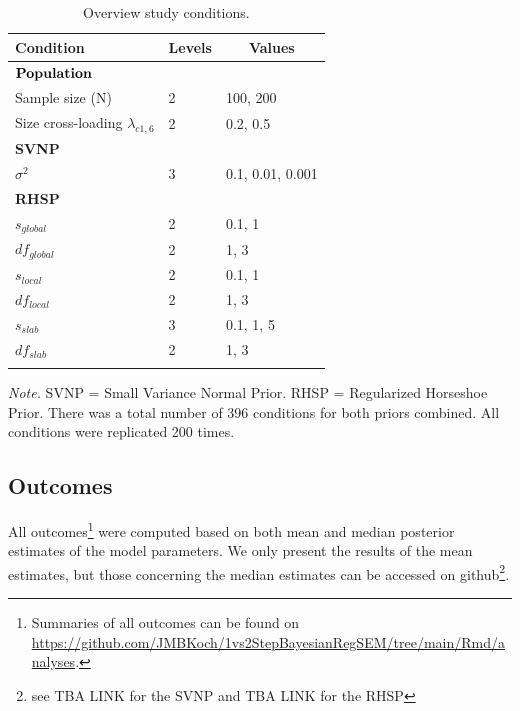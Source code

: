 \documentclass[
  man, donotrepeattitle,floatsintext]{apa6}
\begin{document}
\begin{table}[tbp]

\begin{center}
\begin{threeparttable}

\caption{\label{tab:unnamed-chunk-2}Overview study conditions.}

\begin{tabular}{lll}
\toprule
Condition & \multicolumn{1}{c}{Levels} & \multicolumn{1}{c}{Values}\\
\midrule
$\bf{Population}$ &  & \\
Sample size (N) & 2 & 100, 200\\
Size cross-loading $\lambda_{c1 , 6}$ & 2 & 0.2, 0.5\\
\bf{SVNP} &  & \\
$\sigma^2$ & 3 & 0.1, 0.01, 0.001\\
\bf{RHSP} &  & \\
$s_{global}$ & 2 & 0.1, 1\\
$df_{global}$ & 2 & 1, 3\\
$s_{local}$ & 2 & 0.1, 1\\
$df_{local}$ & 2 & 1, 3\\
$s_{slab}$ & 3 & 0.1, 1, 5\\
$df_{slab}$ & 2 & 1, 3\\
\bottomrule
\addlinespace
\end{tabular}

\begin{tablenotes}[para]
\normalsize{\textit{Note.} SVNP = Small Variance Normal Prior. RHSP = Regularized Horseshoe Prior. There was a total number of 396 conditions for both priors combined.  All conditions were replicated 200 times.}
\end{tablenotes}

\end{threeparttable}
\end{center}

\end{table}

\hypertarget{outcomes}{%
\subsection{Outcomes}\label{outcomes}}

All outcomes\footnote{Summaries of all outcomes can be found on \url{https://github.com/JMBKoch/1vs2StepBayesianRegSEM/tree/main/Rmd/analyses}.} were computed based on both mean and median posterior estimates of the model parameters. We only present the results of the mean estimates, but those concerning the median estimates can be accessed on github\footnote{see TBA LINK for the SVNP and TBA LINK for the RHSP}.
\end{document}
